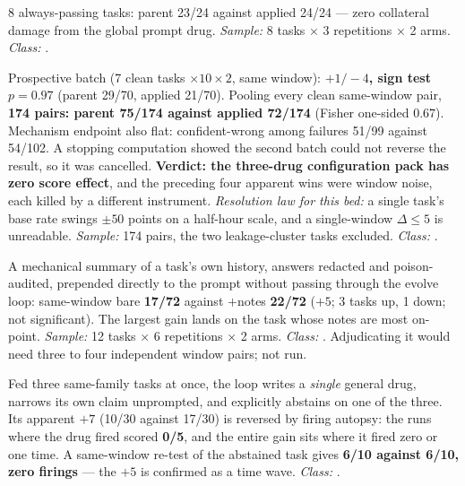 \begin{description}[leftmargin=0pt,style=nextline,font=\normalfont,itemsep=6pt]
\item[\textbf{F33}\quad Canary, for harmlessness.]
8 always-passing tasks: parent 23/24 against applied 24/24 --- zero
collateral damage from the global prompt drug. \emph{Sample:} 8 tasks
$\times$ 3 repetitions $\times$ 2 arms. \emph{Class:} .

\item[\textbf{F34}\quad Pre-registered efficacy verdict.]
Prospective batch (7 clean tasks $\times 10 \times 2$, same window):
\textbf{$+1/-4$, sign test $p = 0.97$} (parent 29/70, applied 21/70).
Pooling every clean same-window pair, \textbf{174 pairs: parent 75/174
against applied 72/174} (Fisher one-sided $0.67$). Mechanism endpoint
also flat: confident-wrong among failures 51/99 against 54/102. A stopping
computation showed the second batch could not reverse the result, so it was
cancelled. \textbf{Verdict: the three-drug configuration pack has zero
score effect}, and the preceding four apparent wins were window noise, each
killed by a different instrument. \emph{Resolution law for this bed:} a
single task's base rate swings $\pm 50$ points on a half-hour scale, and a
single-window $\Delta \le 5$ is unreadable. \emph{Sample:} 174 pairs, the
two leakage-cluster tasks excluded. \emph{Class:} .

\item[\textbf{F35}\quad Episodic-notes arm, the one survivor.]
A mechanical summary of a task's own history, answers redacted and
poison-audited, prepended directly to the prompt without passing through
the evolve loop: same-window bare \textbf{17/72} against $+$notes
\textbf{22/72} ($+5$; 3 tasks up, 1 down; not significant). The largest
gain lands on the task whose notes are most on-point.
\emph{Sample:} 12 tasks $\times$ 6 repetitions $\times$ 2 arms.
\emph{Class:} . Adjudicating it would need three to four
independent window pairs; not run.

\item[\textbf{F36}\quad Cluster feeding, and same-window falsification.]
Fed three same-family tasks at once, the loop writes a \emph{single}
general drug, narrows its own claim unprompted, and explicitly abstains on
one of the three. Its apparent $+7$ (10/30 against 17/30) is reversed by
firing autopsy: the runs where the drug fired scored \textbf{0/5}, and the
entire gain sits where it fired zero or one time. A same-window re-test of
the abstained task gives \textbf{6/10 against 6/10, zero firings} --- the
$+5$ is confirmed as a time wave. \emph{Class:} .


\end{description}
